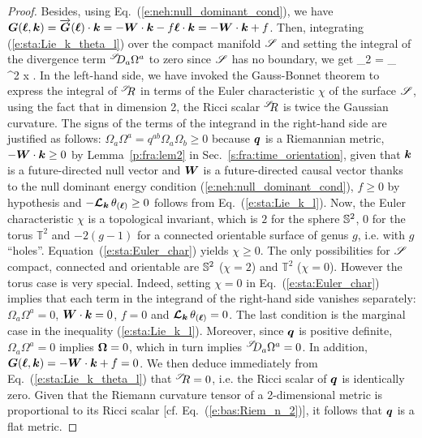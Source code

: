 \begin{proof}
Besides, using Eq.~(\ref{e:neh:null_dominant_cond}), we have
$\bm{G}(\bm{\ell}, \bm{k}) = \overrightarrow{\bm{G}}(\bm{\ell})\cdot\bm{k} = - \bm{W}\cdot\bm{k} - f \bm{\ell}\cdot \bm{k} = - \bm{W}\cdot\bm{k} + f$.
Then, integrating (\ref{e:sta:Lie_k_theta_l}) over the compact manifold $\mathscr{S}$
and setting the integral of the divergence term ${}^{\mathscr{S}}\!\!D_a \Omega^a$ to zero since
$\mathscr{S}$ has no boundary, we get
\be \label{e:sta:Euler_char}
    _{2\pi\chi} = \int_\Sp {}
           \, \D^2 x .
\ee
In the left-hand side, we have invoked the Gauss-Bonnet theorem
to express the integral of ${}^{\mathscr{S}}\!\! R$ in terms
of the Euler characteristic $\chi$ of the
surface $\mathscr{S}$, using the fact that in dimension 2,
the Ricci scalar ${}^{\mathscr{S}}\!\! R$ is twice the
Gaussian curvature.
The signs of the terms of the integrand in the right-hand side
are justified as follows:
$\Omega_a \Omega^a = q^{ab} \Omega_a \Omega_b \geq 0$ because $\bm{q}$ is a Riemannian metric,
$- \bm{W}\cdot\bm{k} \geq 0$ by Lemma~\ref{p:fra:lem2} in Sec.~\ref{s:fra:time_orientation},
given that $\bm{k}$ is a future-directed null vector and $\bm{W}$ is a future-directed
causal vector thanks to the null dominant energy condition (\ref{e:neh:null_dominant_cond}),
$f\geq 0$ by hypothesis and $- \bm{\mathcal{L}}_{\bm{k}}\, \theta_{(\bm{\ell})} \geq 0$
follows from Eq.~(\ref{e:sta:Lie_k_l}). Now, the Euler characteristic $\chi$ is a topological
invariant, which is $2$ for the sphere $\mathbb{S}^2$, $0$ for the torus $\mathbb{T}^2$
and $-2(g-1)$
for a connected orientable surface of genus $g$, i.e. with $g$ ``holes''.
Equation~(\ref{e:sta:Euler_char}) yields $\chi \geq 0$.
The only possibilities for $\mathscr{S}$ compact, connected and orientable
are $\mathbb{S}^2$ ($\chi = 2$) and $\mathbb{T}^2$ ($\chi = 0$).
However the torus case is very special. Indeed, setting $\chi=0$ in Eq.~(\ref{e:sta:Euler_char})
implies that each term in the integrand of the right-hand side vanishes separately:
$\Omega_a \Omega^a = 0$, $\bm{W}\cdot\bm{k} = 0$, $f=0$ and $\bm{\mathcal{L}}_{\bm{k}}\, \theta_{(\bm{\ell})} = 0$.
The last condition is the marginal case in the inequality (\ref{e:sta:Lie_k_l}). Moreover,
since $\bm{q}$ is positive definite, $\Omega_a \Omega^a = 0$ implies $\bm{\Omega} = 0$,
which in turn implies ${}^{\mathscr{S}}\!\!D_a \Omega^a = 0$. In addition,
$\bm{G}(\bm{\ell}, \bm{k}) = - \bm{W}\cdot\bm{k} + f = 0$. We then deduce immediately from
Eq.~(\ref{e:sta:Lie_k_theta_l}) that ${}^{\mathscr{S}}\!\! R = 0$, i.e.
the Ricci scalar of $\bm{q}$ is identically zero. Given that the Riemann
curvature tensor of a 2-dimensional metric is proportional to its
Ricci scalar [cf. Eq.~(\ref{e:bas:Riem_n_2})], it follows that $\bm{q}$
is a flat metric.
\end{proof}


